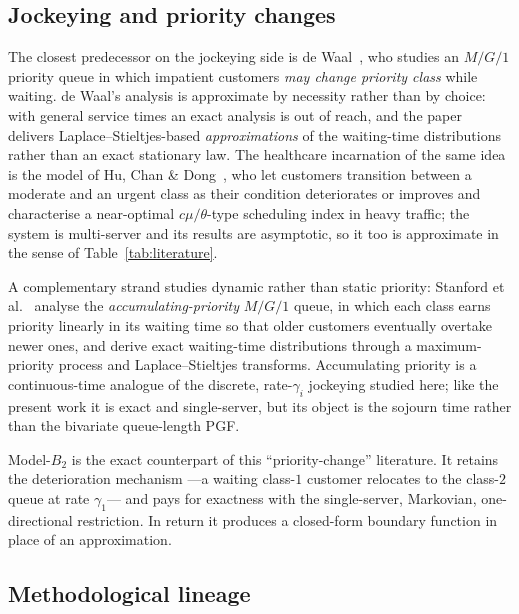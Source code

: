 \subsection*{Jockeying and priority changes}

The closest predecessor on the jockeying side is de Waal~\cite{deWaal1992approximate}, who studies an $M/G/1$ priority queue in which impatient customers \emph{may change priority class} while waiting. de Waal's analysis is approximate by necessity rather than by choice: with general service times an exact analysis is out of reach, and the paper delivers Laplace--Stieltjes-based \emph{approximations} of the waiting-time distributions rather than an exact stationary law. The healthcare incarnation of the same idea is the model of Hu, Chan \& Dong~\cite{huchandong2022proactive}, who let customers transition between a moderate and an urgent class as their condition deteriorates or improves and characterise a near-optimal $c\mu/\theta$-type scheduling index in heavy traffic; the system is multi-server and its results are asymptotic, so it too is approximate in the sense of Table~\ref{tab:literature}.

A complementary strand studies dynamic rather than static priority: Stanford et al.~\cite{stanford2014accumulating} analyse the \emph{accumulating-priority} $M/G/1$ queue, in which each class earns priority linearly in its waiting time so that older customers eventually overtake newer ones, and derive exact waiting-time distributions through a maximum-priority process and Laplace--Stieltjes transforms. Accumulating priority is a continuous-time analogue of the discrete, rate-$\gamma_i$ jockeying studied here; like the present work it is exact and single-server, but its object is the sojourn time rather than the bivariate queue-length PGF.

Model-$B_2$ is the exact counterpart of this ``priority-change'' literature. It retains the deterioration mechanism ---a waiting class-$1$ customer relocates to the class-$2$ queue at rate $\gamma_1$--- and pays for exactness with the single-server, Markovian, one-directional restriction. In return it produces a closed-form boundary function in place of an approximation.

\subsection*{Methodological lineage}


